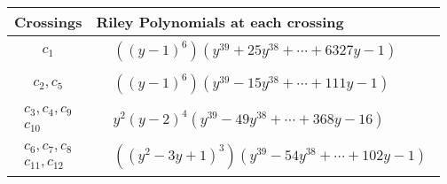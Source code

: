 \documentclass[1p]{elsarticle_modified}
\theoremstyle{definition}
\begin{document}
\begin{tabular}{m{50pt}|m{274pt}}
Crossings & \hspace{64pt}Riley Polynomials at each crossing \\
\hline $$\begin{aligned}c_{1}\end{aligned}$$&$\begin{aligned}
&((y-1)^6)(y^{39}+25 y^{38}+\cdots+6327 y-1)
\end{aligned}$\\
\hline $$\begin{aligned}c_{2},c_{5}\end{aligned}$$&$\begin{aligned}
&((y-1)^6)(y^{39}-15 y^{38}+\cdots+111 y-1)
\end{aligned}$\\
\hline $$\begin{aligned}c_{3},c_{4},c_{9}\\c_{10}\end{aligned}$$&$\begin{aligned}
&y^2(y-2)^4(y^{39}-49 y^{38}+\cdots+368 y-16)
\end{aligned}$\\
\hline $$\begin{aligned}c_{6},c_{7},c_{8}\\c_{11},c_{12}\end{aligned}$$&$\begin{aligned}
&((y^2-3 y+1)^3)(y^{39}-54 y^{38}+\cdots+102 y-1)
\end{aligned}$\\
\hline
\end{tabular}
\vskip 2pc
\end{document}
